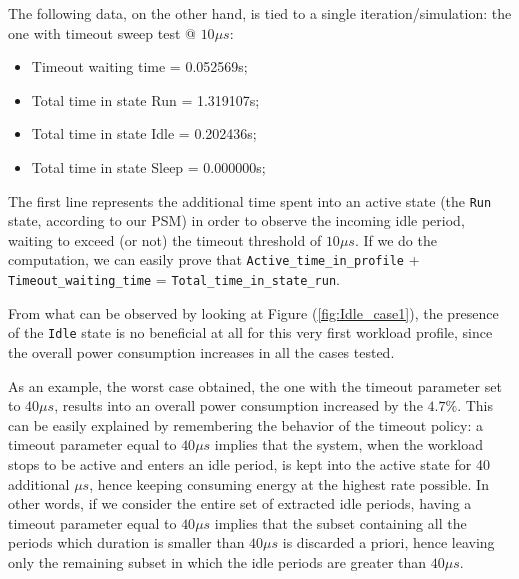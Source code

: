 \documentclass[a4paper]{article}
\begin{document}
            The following data, on the other hand, is tied to a single iteration/simulation: the one with timeout sweep test @ $10 \mu s$:
            \begin{itemize}
                \item Timeout waiting time = 0.052569s;
                \item Total time in state Run = 1.319107s;
                \item Total time in state Idle = 0.202436s;
                \item Total time in state Sleep = 0.000000s;
            \end{itemize}

            The first line represents the additional time spent into an active state (the \texttt{Run} state, according to our PSM) in order to observe the incoming idle period, waiting to exceed (or not) the timeout threshold of $10 \mu s$. If we do the computation, we can easily prove that \texttt{Active\_time\_in\_profile} + \texttt{Timeout\_waiting\_time} = \texttt{Total\_time\_in\_state\_run}.

            From what can be observed by looking at Figure (\ref{fig:Idle_case1}), the presence of the \texttt{Idle} state is no beneficial at all for this very first workload profile, since the overall power consumption increases in all the cases tested.

            As an example, the worst case obtained, the one with the timeout parameter set to $40 \mu s$, results into an overall power consumption increased by the $4.7\%$.
            This can be easily explained by remembering the behavior of the timeout policy: a timeout parameter equal to $40 \mu s$ implies that the system, when the workload stops to be active and enters an idle period, is kept into the active state for 40 additional $\mu s$, hence keeping consuming energy at the highest rate possible. In other words, if we consider the entire set of extracted idle periods, having a timeout parameter equal to $40 \mu s$ implies that the subset containing all the periods which duration is smaller than $40 \mu s$ is discarded a priori, hence leaving only the remaining subset in which the idle periods are greater than $40 \mu s$.
\end{document}
